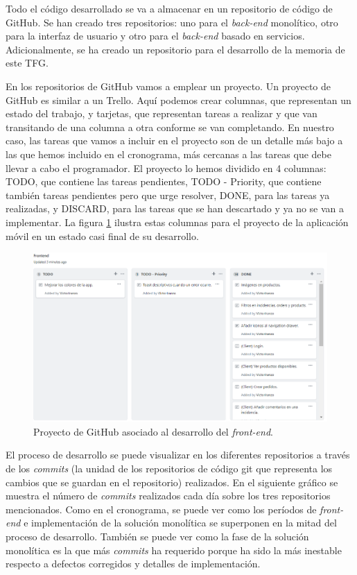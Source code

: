 \documentclass[11pt,spanish,listoffigures]{tfgetsinf}
\begin{document}
Todo el código desarrollado se va a almacenar en un repositorio de código de GitHub. Se han creado tres repositorios: uno para el \textit{back-end} monolítico, otro para la interfaz de usuario y otro para el \textit{back-end} basado en servicios. Adicionalmente, se ha creado un repositorio para el desarrollo de la memoria de este TFG.

En los repositorios de GitHub vamos a emplear un proyecto. Un proyecto de GitHub es similar a un Trello. Aquí podemos crear columnas, que representan un estado del trabajo, y tarjetas, que representan tareas a realizar y que van transitando de una columna a otra conforme se van completando. En nuestro caso, las tareas que vamos a incluir en el proyecto son de un detalle más bajo a las que hemos incluido en el cronograma, más cercanas a las tareas que debe llevar a cabo el programador. El proyecto lo hemos dividido en 4 columnas: TODO, que contiene las tareas pendientes, TODO - Priority, que contiene también tareas pendientes pero que urge resolver, DONE, para las tareas ya realizadas, y DISCARD, para las tareas que se han descartado y ya no se van a implementar. La figura \ref{fig:GitHubProject} ilustra estas columnas para el proyecto de la aplicación móvil en un estado casi final de su desarrollo.

\begin{figure}[h]
\centering
\includegraphics[scale=0.6]{GitHubProject}
\caption{Proyecto de GitHub asociado al desarrollo del \textit{front-end}.}
\label{fig:GitHubProject}
\end{figure}

\newpage


El proceso de desarrollo se puede visualizar en los diferentes repositorios a través de los \textit{commits} (la unidad de los repositorios de código git que representa los cambios que se guardan en el repositorio) realizados. En el siguiente gráfico se muestra el número de \textit{commits} realizados cada día sobre los tres repositorios mencionados. Como en el cronograma, se puede ver como los períodos de \textit{front-end} e implementación de la solución monolítica se superponen en la mitad del proceso de desarrollo. También se puede ver como la fase de la solución monolítica es la que más \textit{commits} ha requerido porque ha sido la más inestable respecto a defectos corregidos y detalles de implementación.
\end{document}
